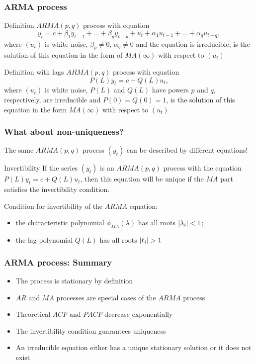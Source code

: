 \begin{frame}
	\frametitle{ARMA process}
	
	\begin{block}{Definition}
		$ARMA(p, q)$ process with equation
		\[
		y_t = c + \beta_1 y_{t-1} + \ldots + \beta_p y_{t-p} + u_t + \alpha_1 u_{t-1} + \ldots + \alpha_q u_{t-q},
		\]
		where $(u_t)$ is white noise, $\beta_p \neq 0$, $\alpha_q \neq 0$ and the equation is irreducible, is the
		solution of this equation in the form of $MA(\infty)$ with respect to $(u_t)$
	\end{block}
	
	\pause
	\begin{block}{Definition with lags}
		$ARMA(p,q)$ process with equation
		\[
		P(L)y_t = c + Q(L)u_t,
		\]
		where $(u_t)$ is white noise, $P(L)$ and $Q(L)$ have powers $p$ and $q$, respectively, are irreducible and $P(0)=Q(0)=1$, is 	the solution of this equation in  the form $MA(\infty)$ with respect to $(u_t)$
	\end{block}
\end{frame}


\begin{frame}
	\frametitle{What about non-uniqueness?}
	
	The same $ARMA(p, q)$ process $(y_t)$ can be described by different equations!
	\pause
	
	\begin{block}{Invertibility}
		If the series $(y_t)$ is an $ARMA(p, q)$ process with the equation $P(L) y_t = c + Q(L) u_t$,
		then this equation will be unique if the $MA$ part satisfies the invertibility condition.
	\end{block}
	
	\pause
	Condition for  invertibility of the $ARMA$ equation:
	\begin{itemize}
		\item the characteristic polynomial $\phi_{MA}(\lambda)$ has all roots $\abs{\lambda_i} <1$;
		\item the lag polynomial $Q(L)$ has all roots $\abs{\ell_i} >1$
	\end{itemize}
	
	
\end{frame}



\begin{frame}
	\frametitle{ARMA process: Summary}
	\begin{itemize}[<+->]
		\item The process is stationary by \alert{definition}
		\item $AR$ and $MA$ processes are \alert{special cases} of the $ARMA$ process
		\item Theoretical $ACF$ and $PACF$ decrease \alert{exponentially}
		\item The invertibility condition guarantees \alert{uniqueness}
		\item An irreducible equation either has a \alert{unique} stationary solution  or it does not exist
	\end{itemize}
\end{frame}
